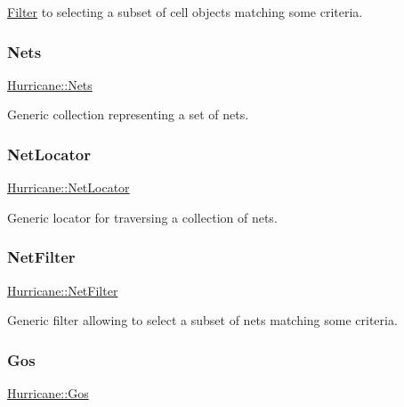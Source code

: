 \mbox{\hyperlink{classHurricane_1_1Filter}{Filter}} to selecting a subset of cell objects matching some criteria. \mbox{\label{namespaceHurricane_a3404a8b17130a1824f4a281704b04df7}} 
\subsubsection{\texorpdfstring{Nets}{Nets}}
{\footnotesize\ttfamily \mbox{\hyperlink{namespaceHurricane_a3404a8b17130a1824f4a281704b04df7}{Hurricane\+::\+Nets}}}

Generic collection representing a set of nets. \mbox{\label{namespaceHurricane_a2911512d442f8332c3cd3a135332cc02}} 
\subsubsection{\texorpdfstring{Net\+Locator}{NetLocator}}
{\footnotesize\ttfamily \mbox{\hyperlink{namespaceHurricane_a2911512d442f8332c3cd3a135332cc02}{Hurricane\+::\+Net\+Locator}}}

Generic locator for traversing a collection of nets. \mbox{\label{namespaceHurricane_a0dfd2c5b40325a919d139091312732e9}} 
\subsubsection{\texorpdfstring{Net\+Filter}{NetFilter}}
{\footnotesize\ttfamily \mbox{\hyperlink{namespaceHurricane_a0dfd2c5b40325a919d139091312732e9}{Hurricane\+::\+Net\+Filter}}}

Generic filter allowing to select a subset of nets matching some criteria. \mbox{\label{namespaceHurricane_a4456a34f3bc6766d471c3064ace19759}} 
\subsubsection{\texorpdfstring{Gos}{Gos}}
{\footnotesize\ttfamily \mbox{\hyperlink{namespaceHurricane_a4456a34f3bc6766d471c3064ace19759}{Hurricane\+::\+Gos}}}

